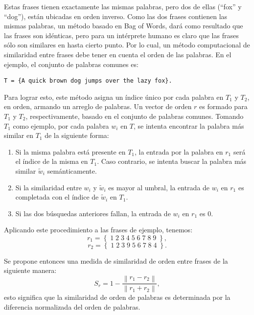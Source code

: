 Estas frases tienen exactamente las mismas palabras, pero dos de ellas (``fox'' y ``dog''), están ubicadas en orden inverso. Como las dos frases contienen las mismas palabras, un método basado en Bag of Words, dará como resultado que las frases son idénticas, pero para un intérprete humano es claro que las frases sólo son similares en hasta cierto punto. Por lo cual, un método computacional de similaridad entre frases debe tener en cuenta el orden de las palabras. En el ejemplo, el conjunto de palabras comunes es:

\begin{center}\ttfamily{}%
\begin{minipage}{45\wd0}%
	\begin{verbatim}
T = {A quick brown dog jumps over the lazy fox}.
	\end{verbatim}
\end{minipage}
\end{center}
Para lograr esto, este método asigna un índice único por cada palabra en \(T_1\) y \(T_2\), en orden, armando un arreglo de palabras. Un vector de orden \(r\) es formado para \(T_1\) y \(T_2\), respectivamente, basado en el conjunto de palabras comunes. Tomando \(T_1\) como ejemplo, por cada palabra \(w_i\) en \(T\), se intenta encontrar la palabra más similar en \(T_1\) de la siguiente forma:
\begin{enumerate}
	\item Si la misma palabra está presente en \(T_1\), la entrada por la palabra en \(r_1\) será el índice de la misma en \(T_1\). Caso contrario, se intenta buscar la palabra más similar \(\widetilde{w}_i \) semánticamente.
	\item Si la similaridad entre \(w_i\) y \(\widetilde{w}_i \) es mayor al umbral, la entrada de \(w_i\) en \(r_1\) es completada con el índice de \(\widetilde{w}_i \) en \(T_1\).
	\item Si las dos búsquedas anteriores fallan, la entrada de \(w_i \) en \(r_1\) es \(0\).
\end{enumerate}
Aplicando este procedimiento a las frases de ejemplo, tenemos:
\[r_1 = \left \{\;1\;2\;3\;4\;5\;6\;7\;8\;9\;\right \},\]
\[r_2 = \left \{\;1\;2\;3\;9\;5\;6\;7\;8\;4\;\right \}.\]

Se propone entonces una medida de similaridad de orden entre frases de la siguiente manera:
\[S_r = 1 - \frac{\left \| r_1 - r_2 \right \|}{\left \| r_1 + r_2 \right \|},\]
esto significa que la similaridad de orden de palabras es determinada por la diferencia normalizada del orden de palabras.

